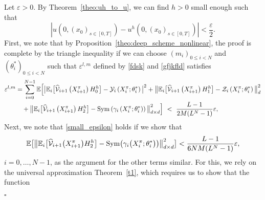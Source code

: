 \documentclass[12pt]{article}
\numberwithin{equation}{section}
\newenvironment{Proof}{\removelastskip\par\medskip \noindent{\em Proof.} \rm}{\penalty-20\null\hfill$\square$\par\medbreak}
\newcommand{\E}{\mathbb{E}}
\begin{document}
\begin{Proof}
Let $\varepsilon >0$. By Theorem~\ref{theo:uh_to_u},
we can find $h > 0$ small enough such that
\begin{equation}
\nonumber %
    \left\lvert u\left(0, (x_0)_{s \in [0,T]}\right)
                     - u^h\left(0, (x_0)_{s \in [0,T]}\right)\right\rvert < \frac{\varepsilon}{2}.
\end{equation}
First, we note that by Proposition~\ref{theo:deep_scheme_nonlinear}, the proof is complete
by the triangle inequality if we can choose
$(m_i)_{0 \leq i < N }$ and $(\theta_i^*)_{0 \leq i < N }$
 such that $\varepsilon^{l,m}$ defined by \eqref{fdsk} and \eqref{gfjkfld} satisfies
 \begin{align}
    \label{small_epsilon}
\nonumber
\varepsilon^{l,m}
& = \sum\limits_{i = 0}^{N-1} \E\Bigl[ \big\lvert\E_i\big[
        \widehat{\cal V}_{i+1}\left(X^\pi_{i+1}\right) H_0^h\big]
                - {\cal Y}_i\left(X^\pi_i;\theta_i^*\right)\big\rvert^2
 + \big\lVert\E_i\big[
        \widehat{\cal V}_{i+1}\left(X^\pi_{i+1}\right)H_1^h\big]
                - {\cal Z}_i\left(X^\pi_i;\theta_i^*\right)\big\rVert_d^2
\\
& \quad + \big\lVert\E_i\big[
        \widehat{\cal V}_{i+1}\left(X^\pi_{i+1}\right)H_2^h\big]
    - {\rm Sym} \left({\cal \gamma}_i\left(X^\pi_i;\theta_i^*\right)\right)
    \big\rVert_{d\times d}^2 \Bigr] \ < \
 \frac{L-1}{2M(L^N - 1)}
 \varepsilon,
\end{align}
Next, we note that \eqref{small_epsilon} holds if we show that
\begin{equation}
\nonumber %
    \E \big[ \big\lVert\E_i\big[
        \widehat{\cal V}_{i+1}\big(X^\pi_{i+1}\big)H_2^h\big]
    - {\rm Sym} \big({\cal \gamma}_i\big(X^\pi_i;\theta_i^*\big)\big)
                \big\rVert_{d\times d}^2 \big] <  \frac{L-1}{6NM(L^N - 1)}\varepsilon,
\end{equation}
 $i=0,\ldots , N-1$, as the argument for the other terms similar.
 For this, we rely on
the universal approximation Theorem~\ref{t1},
which requires us to show that the function

\end{Proof}
\end{document}
